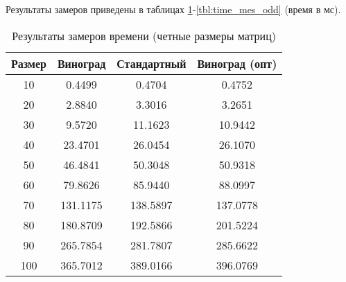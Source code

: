 Результаты замеров приведены в таблицах \ref{tbl:time_mes_even}-\ref{tbl:time_mes_odd} (время в мс).

\begin{table}[h]
    \begin{center}
        \begin{threeparttable}
        \captionsetup{justification=raggedright,singlelinecheck=off}
        \caption{Результаты замеров времени (четные размеры матриц)}
        \label{tbl:time_mes_even}
        \begin{tabular}{|c|c|c|c|}
            \hline
            Размер & Виноград & Стандартный & Виноград (опт) \\
            \hline
            10 & 0.4499 & 0.4704 & 0.4752 \\ 
            \hline
            20 & 2.8840 & 3.3016 & 3.2651 \\ 
            \hline
            30 & 9.5720 & 11.1623 & 10.9442 \\ 
            \hline
            40 & 23.4701 & 26.0454 & 26.1070 \\ 
            \hline
            50 & 46.4841 & 50.3048 & 50.9318 \\ 
            \hline
            60 & 79.8626 & 85.9440 & 88.0997 \\ 
            \hline
            70 & 131.1175 & 138.5897 & 137.0778 \\ 
            \hline
            80 & 180.8709 & 192.5866 & 201.5224 \\ 
            \hline
            90 & 265.7854 & 281.7807 & 285.6622 \\ 
            \hline
            100 & 365.7012 & 389.0166 & 396.0769 \\ 
            \hline
		\end{tabular}
    \end{threeparttable}
\end{center}
\end{table}

\clearpage


